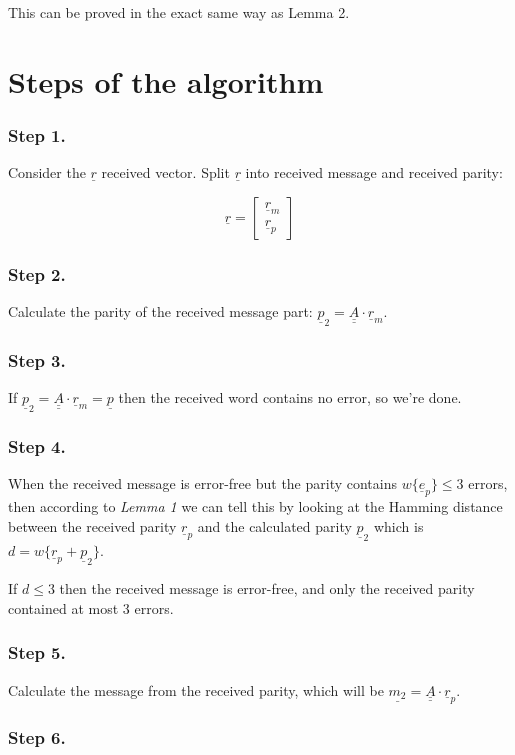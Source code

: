 \documentclass[11pt,a4paper,oneside]{report}             %
\def\doubleunderline#1{\underline{\underline{#1}}}
\def\dul#1{\doubleunderline{#1}}
\def\ul#1{\underline{#1}}
\newcommand{\vect}[2]{\begin{bmatrix} #1 \\ #2 \end{bmatrix}}
\begin{document}
This can be proved in the exact same way as Lemma 2.

\section{Steps of the algorithm}

\subsubsection{Step 1.}

Consider the $\ul{r}$ received vector.
Split $\ul{r}$ into received message and received parity:

\[
    \ul{r} = \vect{\ul{r}_m}{\ul{r}_p}
\]

\subsubsection{Step 2.}

Calculate the parity of the received message part: $\ul{p}_2 = \dul{A} \cdot \ul{r}_m$.

\subsubsection{Step 3.}

If $\ul{p}_2 = \dul{A} \cdot \ul{r}_m = \ul{p}$ then the received word contains no error, so we're done.

\subsubsection{Step 4.}

When the received message is error-free but the parity contains $w\{\ul{e}_p\} \leq 3$ errors, then according to
\emph{Lemma 1} we can tell this by looking at the Hamming distance between the received parity $\ul{r}_p$ and
the calculated parity $\ul{p}_2$ which is $d = w\{\ul{r}_p + \ul{p}_2\}$.

If $d \leq 3$ then the received message is error-free, and only the received parity contained at most 3 errors.

\subsubsection{Step 5.}

Calculate the message from the received parity, which will be $\ul{m_2} = \dul{A} \cdot \ul{r}_p$.

\subsubsection{Step 6.}
\end{document}

